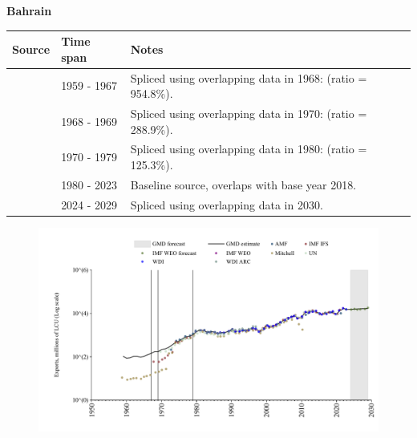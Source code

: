 \documentclass[12pt,a4paper,landscape]{article}
\begin{document}
\begin{adjustbox}{max totalsize={\paperwidth}{\paperheight},center}
\begin{minipage}[t][\textheight][t]{\textwidth}
\vspace*{0.5cm}
{}
\begin{center}
{\Large\bfseries Bahrain}
\end{center}
\vspace{0.5cm}
\begin{table}[H]
\centering
\small
\begin{tabular}{|l|l|l|}
\hline
\textbf{Source} & \textbf{Time span} & \textbf{Notes} \\
\hline
\rowcolor{white}\cite{Mitchell}& 1959 - 1967 &Spliced using overlapping data in 1968: (ratio = 954.8\%).\\
\rowcolor{lightgray}\cite{IMF_IFS}& 1968 - 1969 &Spliced using overlapping data in 1970: (ratio = 288.9\%).\\
\rowcolor{white}\cite{UN}& 1970 - 1979 &Spliced using overlapping data in 1980: (ratio = 125.3\%).\\
\rowcolor{lightgray}\cite{WDI}& 1980 - 2023 &Baseline source, overlaps with base year 2018.\\
\rowcolor{white}\cite{IMF_WEO_forecast}& 2024 - 2029 &Spliced using overlapping data in 2030.\\
\hline
\end{tabular}
\end{table}
\begin{figure}[H]
\centering
\includegraphics[width=\textwidth,height=0.6\textheight,keepaspectratio]{graphs/BHR_exports.pdf}
\end{figure}
\end{minipage}
\end{adjustbox}
\end{document}
